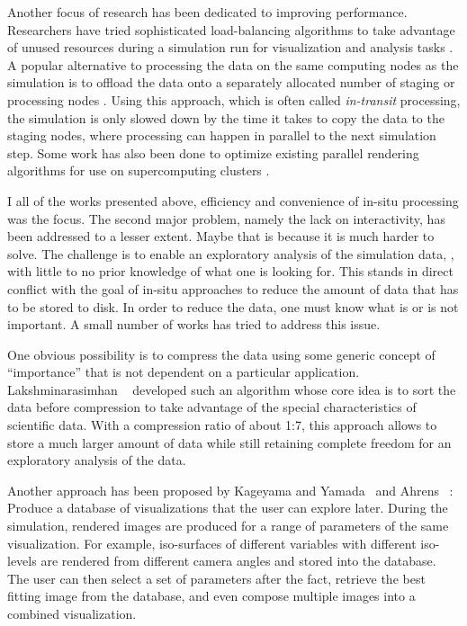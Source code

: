 %
Another focus of research has been dedicated to improving performance.
%
Researchers have tried sophisticated load-balancing algorithms to take advantage
of unused resources during a simulation run for visualization and analysis tasks
\cite{Zheng2013}.
%
A popular alternative to processing the data on the same computing nodes as the
simulation is to offload the data onto a separately allocated number of staging
or processing
nodes \cite{Zheng2010,Abbasi2010,Abbasi2011,Docan2011,Docan2012,Bennett2012}.
%
Using this approach, which is often called \emph{in-transit} processing, the
simulation is only slowed down by the time it takes to copy the data to the
staging nodes, where processing can happen in parallel to the next simulation
step.
%
Some work has also been done to optimize existing parallel rendering algorithms
for use on supercomputing
clusters \cite{Yu2008,Kendall2010,Moreland2011a,Cavin2012,Nonaka2014,Grosset2016}.
%

%
I all of the works presented above, efficiency and convenience of in-situ
processing was the focus.
%
The second major problem, namely the lack on interactivity, has been addressed
to a lesser extent.
%
Maybe that is because it is much harder to solve.
%
The challenge is to enable an exploratory analysis of the simulation data, \ie,
with little to no prior knowledge of what one is looking for.
%
This stands in direct conflict with the goal of in-situ approaches to reduce the
amount of data that has to be stored to disk.
%
In order to reduce the data, one must know what is or is not important.
%
A small number of works has tried to address this issue.
%

%
One obvious possibility is to compress the data using some generic concept of
``importance'' that is not dependent on a particular application.
%
Lakshminarasimhan \etal~\cite{Lakshminarasimhan2011} developed such an algorithm
whose core idea is to sort the data before compression to take advantage of the
special characteristics of scientific data.
%
With a compression ratio of about 1:7, this approach allows to store a much larger
amount of data while still retaining complete freedom for an exploratory
analysis of the data.
%

%
Another approach has been proposed by Kageyama and Yamada~\cite{Kageyama2014}
and Ahrens \etal~\cite{Ahrens2014}:
%
Produce a database of visualizations that the user can explore later.
%
During the simulation, rendered images are produced for a range of parameters
of the same visualization.
%
For example, iso-surfaces of different variables with different iso-levels are
rendered from different camera angles and stored into the database.
%
The user can then select a set of parameters after the fact, retrieve the
best fitting image from the database, and even compose multiple images into
a combined visualization.
%

